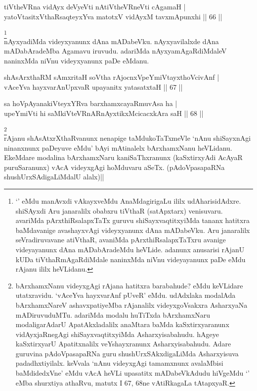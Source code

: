 
\begin{shl}
tiVtheVRna vidAyx deVyeVti nAtiVtheVRneVti cA\s \s gamaH | \\
yatoV\s tasitxVthaRsaqteyxYva matotxV vidAyxM tavxmApunxhi \hfill|| 66 || 
\end{shl}


\begin{artha}
\footnote[2]{`\stext' eMdu manAvxdi vAkayxveMdu AnaMdagirigaLu ililx 
udAharisidAdxre. shiSAyxdi Aru janaralilx obabxru tiVthaR (satApxtarx) 
venisuvaru. avariMda pArxthiRsalapxTaTx guruvu shiSayxvaqtitxyiMda 
tananx hatitxra baMdavanige avashayxvAgi videyxyanunx dAna mADabeVku. 
Aru janaralilx seVradiruvavane atiVthaR, avaniMda pArxthiRsalapxTaTxru 
avanige videyayanunx dAna mADabAradeMdu heVLide. adanunx anusarisi 
rAjanU kUDa tiVthaRmAgaRdiMdale naninxMda niVnu videyayanunx paDe eMdu 
rAjanu ililx heVLidanu.}\\
nAyxyadiMda videyxyanunx dAna mADabeVku. nAyxyavilalxde dAna 
mADabAradeMba Agamavu iruvudu. adariMda nAyxyamAgaRdiMdaleV naninxMda 
niVnu videyxyanunx paDe eMdanu.
\end{artha}


\begin{shl}
shAsArxthaRM sAmxritaH soV\s tha rAjocnxVpeYmiVtayxthoVcivAnf | \\
vAceYva hayxvarAnUpxvaR upayanitx yatasatxtaH \hfill|| 67 || 
\end{shl}

\begin{shl}
sa hoVpAyanakiVteyxYRva barxhamxcayaRmuvAsa ha | \\
upeYmiVti hi saMkiVteVRnARnAyxtikxMcicacxkAra saH \hfill|| 68 ||  
\end{shl}

\begin{artha}
\footnote[3]{bArxhamxNanu videyxgAgi rAjana hatitxra barabahude? eMdu 
keVLidare utatxravidu. `vAceYva hayxvarAnf pUveR' eMdu. udAdxlaka 
modalAda bArxhamxNareV ashavxpatiyeMba rAjanalilx videyxgoVsakxra 
AsharxyaNa mADiruvuduMTu. adariMda modalu huTiTxda bArxhamxNaru 
modaligarAdarU ApatAkxladalilx anaMtara baMda kaSxtirxyaranunx 
vidAyxjaRnegAgi shiSayxvaqtitxyiMda Asharxyisabahudu. hAgeye 
kaSxtirxyarU Apatitxnalilx veYshayxranunx Asharxyisabahudu. Adare 
guruvina pAdoVpasapaRNa guru shushUrxSAkxdigaLiMda Asharxyisuva 
padadhxtiyilalx. keVvala `nAnu videyxgAgi tamamxnunx avalaMbisi 
baMdidedxVne' eMdu vAcA heVLi upasatitx mADabeVkAdudu hiVgeMdu 
`\stext' eMba shurxtiya athaRvu, matutx I 67, 68ne vAtiRkagaLa 
tAtapxyaR.}\\
rAjanu shAsAtxrXthaRvanunx nenapige taMdukoTaTxmeVle `nAnu shiSayxnAgi 
ninanxnunx paDeyuve eMdu' bAyi mAtinalelx bArxhamxNanu heVLidanu. 
EkeMdare modalina bArxhamxNaru kaniSaThxranunx (kaSxtirxyAdi AcAyaR 
puruSaranunx) vAcA videyxgAgi hoMduvaru aSeTx. (pAdoVpasapaRNa 
shushUrxSAdigaLiMdalU alalx)||
\end{artha}

